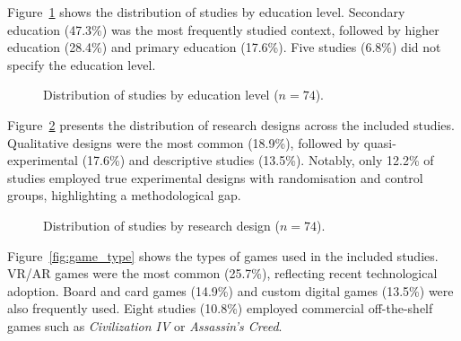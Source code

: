\documentclass[a4paper,fleqn]{cas-sc}
\begin{document}
Figure~\ref{fig:edu_level} shows the distribution of studies by education level. Secondary education (47.3\%) was the most frequently studied context, followed by higher education (28.4\%) and primary education (17.6\%). Five studies (6.8\%) did not specify the education level.

\begin{figure}[ht!]
\centering
{}
\caption{Distribution of studies by education level ($n=74$).}
\label{fig:edu_level}
\end{figure}

Figure~\ref{fig:study_design} presents the distribution of research designs across the included studies. Qualitative designs were the most common (18.9\%), followed by quasi-experimental (17.6\%) and descriptive studies (13.5\%). Notably, only 12.2\% of studies employed true experimental designs with randomisation and control groups, highlighting a methodological gap.

\begin{figure}[ht!]
\centering
{}
\caption{Distribution of studies by research design ($n=74$).}
\label{fig:study_design}
\end{figure}

Figure~\ref{fig:game_type} shows the types of games used in the included studies. VR/AR games were the most common (25.7\%), reflecting recent technological adoption. Board and card games (14.9\%) and custom digital games (13.5\%) were also frequently used. Eight studies (10.8\%) employed commercial off-the-shelf games such as \textit{Civilization IV} or \textit{Assassin's Creed}.
\end{document}
